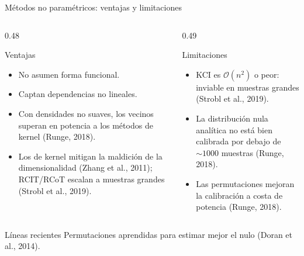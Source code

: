 \documentclass[aspectratio=169,11pt]{beamer}
\newcommand{\srccite}[1]{{\scriptsize\color{upmgray}(#1)}}
\begin{document}
\begin{frame}[t]{Métodos no paramétricos: ventajas y limitaciones}
  \small
  \begin{columns}[T,onlytextwidth]
    \begin{column}{0.48\textwidth}
      \begin{block}{Ventajas}
        \begin{itemize}
          \item No asumen forma funcional.
          \item Captan dependencias no lineales.
          \item Con densidades no suaves, los vecinos superan en potencia a
                los métodos de kernel \srccite{Runge, 2018}.
          \item Los de kernel mitigan la maldición de la dimensionalidad
                \srccite{Zhang et al., 2011}; RCIT/RCoT escalan a muestras
                grandes \srccite{Strobl et al., 2019}.
        \end{itemize}
      \end{block}
    \end{column}
    \begin{column}{0.49\textwidth}
      \begin{alertblock}{Limitaciones}
        \begin{itemize}
          \item KCI es $\mathcal O(n^2)$ o peor: inviable en muestras grandes
                \srccite{Strobl et al., 2019}.
          \item La distribución nula analítica no está bien calibrada por
                debajo de $\sim 1000$ muestras \srccite{Runge, 2018}.
          \item Las permutaciones mejoran la calibración a costa de potencia
                \srccite{Runge, 2018}.
        \end{itemize}
      \end{alertblock}
    \end{column}
  \end{columns}
  \vspace{-0.1cm}
  \begin{exampleblock}{Líneas recientes}
    Permutaciones aprendidas para estimar mejor el nulo
    \srccite{Doran et al., 2014}.
  \end{exampleblock}
\end{frame}

\end{document}
